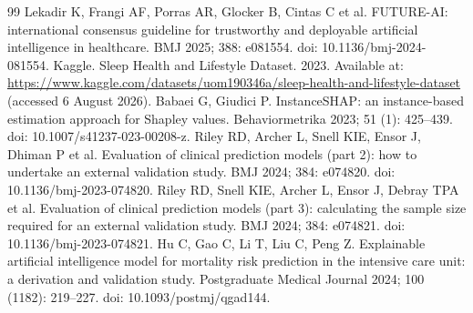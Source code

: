 \documentclass{elektr}
\begin{document}
\begin{thebibliography}{99}
 Lekadir K, Frangi AF, Porras AR, Glocker B, Cintas C et al. FUTURE-AI: international consensus guideline for trustworthy and deployable artificial intelligence in healthcare. BMJ 2025; 388: e081554. doi: 10.1136/bmj-2024-081554.
 Kaggle. Sleep Health and Lifestyle Dataset. 2023. Available at: \url{https://www.kaggle.com/datasets/uom190346a/sleep-health-and-lifestyle-dataset} (accessed 6 August 2026).
 Babaei G, Giudici P. InstanceSHAP: an instance-based estimation approach for Shapley values. Behaviormetrika 2023; 51 (1): 425--439. doi: 10.1007/s41237-023-00208-z.
 Riley RD, Archer L, Snell KIE, Ensor J, Dhiman P et al. Evaluation of clinical prediction models (part 2): how to undertake an external validation study. BMJ 2024; 384: e074820. doi: 10.1136/bmj-2023-074820.
 Riley RD, Snell KIE, Archer L, Ensor J, Debray TPA et al. Evaluation of clinical prediction models (part 3): calculating the sample size required for an external validation study. BMJ 2024; 384: e074821. doi: 10.1136/bmj-2023-074821.
 Hu C, Gao C, Li T, Liu C, Peng Z. Explainable artificial intelligence model for mortality risk prediction in the intensive care unit: a derivation and validation study. Postgraduate Medical Journal 2024; 100 (1182): 219--227. doi: 10.1093/postmj/qgad144.
\end{thebibliography}
\endgroup
\end{document}
